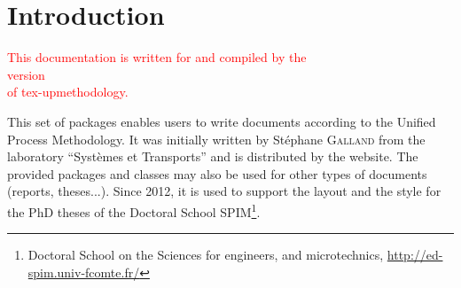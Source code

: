 \documentclass[book,taskpackage,specpackage,codepackage]{upmethodology-document}
\begin{document}
\tableofcontents

\listoffigures

\listoftables


\chapter{Introduction}

\begin{center}
\textcolor{red}{\large This documentation is written for and compiled by the\\version \UPMVERSION\\of tex-upmethodology.}
\end{center}

This set of packages enables users to write documents according to the Unified Process Methodology. It was initially written by St\'ephane \textsc{Galland} from the laboratory ``Syst\`emes et Transports'' and is distributed by the \arakhneorg website.
The provided packages and classes may also be used for other types of documents (reports, theses...). Since 2012, it is used to support the layout and the style for the PhD theses of the Doctoral School SPIM\footnote{Doctoral School on the Sciences for engineers, and microtechnics, \href{http://ed-spim.univ-fcomte.fr/}{http://ed-spim.univ-fcomte.fr/}}.
\end{document}
